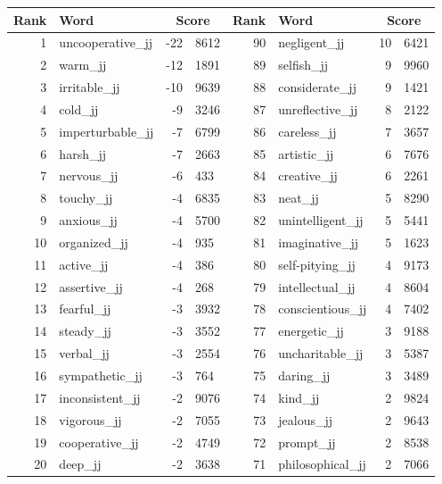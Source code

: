 \begin{table}[tbp]
    \begin{tabular}{| rlr@{.}l | rlr@{.}l |}
    \hline
    \textbf{Rank} & \textbf{Word} & \multicolumn{2}{c|}{\textbf{Score}} & \textbf{Rank} & \textbf{Word} & \multicolumn{2}{c|}{\textbf{Score}} \\
    \hline
    1 & uncooperative\_jj & -22 & 8612    &    90 & negligent\_jj & 10 & 6421 \\
    2 & warm\_jj & -12 & 1891    &    89 & selfish\_jj & 9 & 9960 \\
    3 & irritable\_jj & -10 & 9639    &    88 & considerate\_jj & 9 & 1421 \\
    4 & cold\_jj & -9 & 3246    &    87 & unreflective\_jj & 8 & 2122 \\
    5 & imperturbable\_jj & -7 & 6799    &    86 & careless\_jj & 7 & 3657 \\
    6 & harsh\_jj & -7 & 2663    &    85 & artistic\_jj & 6 & 7676 \\
    7 & nervous\_jj & -6 & 433    &    84 & creative\_jj & 6 & 2261 \\
    8 & touchy\_jj & -4 & 6835    &    83 & neat\_jj & 5 & 8290 \\
    9 & anxious\_jj & -4 & 5700    &    82 & unintelligent\_jj & 5 & 5441 \\
    10 & organized\_jj & -4 & 935    &    81 & imaginative\_jj & 5 & 1623 \\
    11 & active\_jj & -4 & 386    &    80 & self-pitying\_jj & 4 & 9173 \\
    12 & assertive\_jj & -4 & 268    &    79 & intellectual\_jj & 4 & 8604 \\
    13 & fearful\_jj & -3 & 3932    &    78 & conscientious\_jj & 4 & 7402 \\
    14 & steady\_jj & -3 & 3552    &    77 & energetic\_jj & 3 & 9188 \\
    15 & verbal\_jj & -3 & 2554    &    76 & uncharitable\_jj & 3 & 5387 \\
    16 & sympathetic\_jj & -3 & 764    &    75 & daring\_jj & 3 & 3489 \\
    17 & inconsistent\_jj & -2 & 9076    &    74 & kind\_jj & 2 & 9824 \\
    18 & vigorous\_jj & -2 & 7055    &    73 & jealous\_jj & 2 & 9643 \\
    19 & cooperative\_jj & -2 & 4749    &    72 & prompt\_jj & 2 & 8538 \\
    20 & deep\_jj & -2 & 3638    &    71 & philosophical\_jj & 2 & 7066 \\

\end{tabular}
\end{table}
